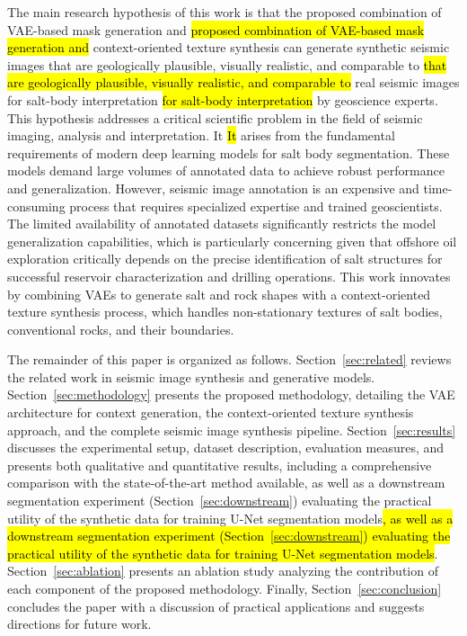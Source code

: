 \documentclass{ieeeaccess}
\makeatletter
\DeclareRobustCommand{\DIFaddbegin}{\DIFOaddbegin \let\includegraphics\DIFaddincludegraphics} %
\DeclareRobustCommand{\DIFaddend}{\DIFOaddend \let\includegraphics\DIFOincludegraphics} %
\DeclareRobustCommand{\DIFdelbegin}{\DIFOdelbegin \let\includegraphics\DIFdelincludegraphics} %
\DeclareRobustCommand{\DIFdelend}{\DIFOaddend \let\includegraphics\DIFOincludegraphics} %
\let\sout@orig\sout %
\renewcommand{\sout}[1]{\ifmmode\text{\sout@orig{\ensuremath{#1}}}\else\sout@orig{#1}\fi} %
\providecommand{\DIFadd}[1]{{\protect\color{blue}#1}}
\providecommand{\DIFdel}[1]{{\protect\color{red}\sout{#1}}}
\renewcommand{\DIFadd}[1]{\ifmmode#1\else\begingroup\let\protect\relax\hl{#1}\endgroup\fi}
\renewcommand{\DIFdel}[1]{}
\providecommand{\DIFaddbegin}{}
\providecommand{\DIFaddend}{}
\providecommand{\DIFdelbegin}{}
\providecommand{\DIFdelend}{}
\renewcommand{\DIFaddbegin}{}
\renewcommand{\DIFaddend}{}
\renewcommand{\DIFdelbegin}{}
\renewcommand{\DIFdelend}{}
\makeatother
\begin{document}
The main research hypothesis of this work is that the \DIFdelbegin \DIFdel{combination of VAEs for generating geometric masks with }\DIFdelend \DIFaddbegin \DIFadd{proposed combination of VAE-based mask generation and }\DIFaddend context-oriented texture synthesis can generate synthetic seismic images \DIFdelbegin \DIFdel{of salt domes that are virtually indistinguishable from }\DIFdelend \DIFaddbegin \DIFadd{that are geologically plausible, visually realistic, and comparable to }\DIFaddend real seismic images \DIFaddbegin \DIFadd{for salt-body interpretation }\DIFaddend by geoscience experts. This hypothesis addresses a critical scientific problem in the field of seismic imaging, analysis and interpretation. \DIFdelbegin \DIFdel{This scientific problem }\DIFdelend \DIFaddbegin \DIFadd{It }\DIFaddend arises from the fundamental requirements of modern deep learning models for salt body segmentation\DIFdelbegin \DIFdel{, analysis and interpretation}\DIFdelend . These models demand large volumes of annotated data to achieve robust performance and generalization. However, seismic image annotation is an expensive and time-consuming process that requires specialized expertise and trained geoscientists. The limited availability of annotated datasets significantly restricts the model generalization capabilities, which is particularly concerning given that offshore oil exploration critically depends on the precise identification of salt structures for successful reservoir characterization and drilling operations. This work innovates by combining VAEs to generate salt and rock shapes with a context-oriented texture synthesis process, which handles non-stationary textures of salt bodies, conventional rocks, and their boundaries. 

The remainder of this paper is organized as follows. Section~\ref{sec:related} reviews the related work in seismic image synthesis and generative models. Section~\ref{sec:methodology} presents the proposed methodology, detailing the VAE architecture for context generation, the context-oriented texture synthesis approach, and the complete seismic image synthesis pipeline. Section~\ref{sec:results} discusses the experimental setup, dataset description, evaluation measures, and presents both qualitative and quantitative results, including a comprehensive comparison with the state-of-the-art method available\DIFaddbegin \DIFadd{, as well as a downstream segmentation experiment (Section~\protect\ref{sec:downstream}) evaluating the practical utility of the synthetic data for training U-Net segmentation models}\DIFaddend . Section~\ref{sec:ablation} presents an ablation study analyzing the contribution of each component of the proposed methodology. Finally, Section~\ref{sec:conclusion} concludes the paper with a discussion of practical applications and suggests directions for future work.
\end{document}

